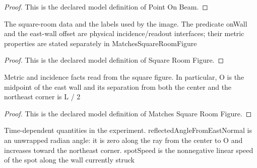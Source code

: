 \begin{proof}
  This is the declared model definition of Point On Beam.
\end{proof}
\begin{definition}
  \label{def:physics:phyx-mini-0025:phyxminiproblems-problemphyxmini0025-squareroomfigure}
  The square-room data and the labels used by the image. The predicate onWall and the east-wall offset are physical incidence/readout interfaces; their metric properties are stated separately in MatchesSquareRoomFigure
\end{definition}
\begin{proof}
  This is the declared model definition of Square Room Figure.
\end{proof}
\begin{definition}
  \label{def:physics:phyx-mini-0025:phyxminiproblems-problemphyxmini0025-matchessquareroomfigure}
  Metric and incidence facts read from the square figure. In particular, O is the midpoint of the east wall and its separation from both the center and the northeast corner is L / 2
\end{definition}
\begin{proof}
  This is the declared model definition of Matches Square Room Figure.
\end{proof}
\begin{definition}
  \label{def:physics:phyx-mini-0025:phyxminiproblems-problemphyxmini0025-rotatingmirrorexperiment}
  Time-dependent quantities in the experiment. reflectedAngleFromEastNormal is an unwrapped radian angle: it is zero along the ray from the center to O and increases toward the northeast corner. spotSpeed is the nonnegative linear speed of the spot along the wall currently struck
\end{definition}
